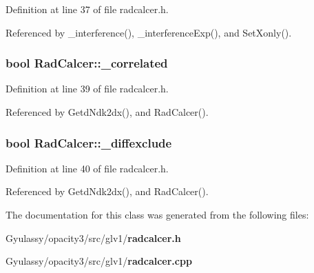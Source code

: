 Definition at line 37 of file radcalcer.h.

Referenced by \_\-interference(), \_\-interferenceExp(), and SetXonly().
\subsubsection{\setlength{\rightskip}{0pt plus 5cm}bool {\bf RadCalcer::\_\-correlated}\hspace{0.3cm}{\tt  [private]}}\label{classRadCalcer_3a2345f90a0d88ee72e25ebb1b558167}




Definition at line 39 of file radcalcer.h.

Referenced by GetdNdk2dx(), and RadCalcer().
\subsubsection{\setlength{\rightskip}{0pt plus 5cm}bool {\bf RadCalcer::\_\-diffexclude}\hspace{0.3cm}{\tt  [private]}}\label{classRadCalcer_8a346eab1c34a2283bbb3e94eea5ed23}




Definition at line 40 of file radcalcer.h.

Referenced by GetdNdk2dx(), and RadCalcer().

The documentation for this class was generated from the following files:\begin{CompactItemize}
\item 
Gyulassy/opacity3/src/glv1/{\bf radcalcer.h}\item 
Gyulassy/opacity3/src/glv1/{\bf radcalcer.cpp}\end{CompactItemize}
